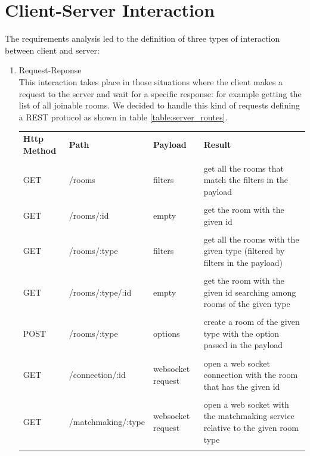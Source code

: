 \section{Client-Server Interaction}
The requirements analysis led to the definition of three types of interaction between client and server:
\begin{enumerate}
	\item Request-Reponse \\
	This interaction takes place in those situations where the client makes a request to the server and wait for a specific response: for example getting the list of all joinable rooms. We decided to handle this kind of requests defining a REST protocol as shown in table \ref{table:server_routes}.
	\begin{table}[]
		\begin{tabular}{p{2cm}p{4cm}p{2cm}p{5.5cm}}
			\textbf{Http Method} & \textbf{Path}	  & \textbf{Payload}  & \textbf{Result}                                                            		\\\\
			GET                  & /rooms             & filters           & get all the rooms that match the filters in the payload                        	\\\\
			GET                  & /rooms/:id         & empty             & get the room with the given id                                                 	\\\\
			GET                  & /rooms/:type       & filters           & get all the rooms with the given type (filtered by filters in the payload)     	\\\\
			GET                  & /rooms/:type/:id   & empty             & get the room with the given id searching among rooms of the given type         	\\\\
			POST                 & /rooms/:type       & options           & create a room of the given type with the option passed in the payload          	\\\\
			GET                  & /connection/:id    & websocket request & open a web socket connection with the room that has the given id               	\\\\
			GET                  & /matchmaking/:type & websocket request & open a web socket with the matchmaking service relative to the given room type 	\\\\

\end{tabular}
\end{table}
\end{enumerate}
